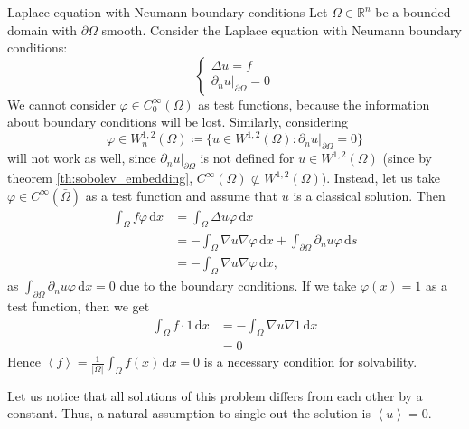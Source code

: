 \documentclass{report}
\begin{document}
\begin{example}{Laplace equation with Neumann boundary conditions}{}
    Let \(\Omega \in \mathbb{R}^{n}\) be a bounded domain with \(\partial \Omega\) smooth. Consider the Laplace equation with Neumann boundary conditions:
    \begin{equation}\label{eq:3.4}
        \begin{cases}
            \Delta u = f \\
            \left. \partial_{n} u \right|_{\partial \Omega} = 0
        \end{cases}
    \end{equation}
    We cannot consider \(\varphi \in C^{\infty}_{0}(\Omega)\) as test functions, because the information about boundary conditions will be lost. Similarly, considering
    \[
        \varphi \in W^{1, 2}_{n}(\Omega) \coloneqq \{u \in W^{1, 2}(\Omega) \colon \left. \partial_{n} u \right|_{\partial \Omega} = 0\}
    \]
    will not work as well, since \(\left. \partial_{n} u \right|_{\partial \Omega}\) is not defined for \(u \in W^{1, 2}(\Omega)\) (since by theorem \ref{th:sobolev_embedding}, \(C^{\infty}(\Omega) \not\subset W^{1, 2}(\Omega)\)). Instead, let us take \(\varphi \in C^{\infty}(\bar{\Omega})\) as a test function and assume that \(u\) is a classical solution. Then
    \begin{align*}
        \int_{\Omega} f \varphi \,\mathrm{d}x &= \int_{\Omega} \Delta  u \varphi \,\mathrm{d}x \\
        &= - \int_{\Omega} \nabla u \nabla \varphi \,\mathrm{d}x + \int_{\partial \Omega} \partial_{n} u \varphi \,\mathrm{d}s \\
        &= - \int_{\Omega} \nabla u \nabla \varphi \,\mathrm{d}x ,
    \end{align*}
    as \(\int_{\partial \Omega} \partial_{n} u \varphi \,\mathrm{d}x = 0\) due to the boundary conditions. If we take \(\varphi(x) = 1\) as a test function, then we get
    \begin{align*}
        \int_{\Omega} f \cdot 1 \,\mathrm{d}x &= - \int_{\Omega} \nabla u \nabla 1 \,\mathrm{d}x \\
        &= 0
    \end{align*}
    Hence \(\left\langle f \right\rangle = \frac{1}{\vert \Omega \vert }\int_{\Omega} f(x) \,\mathrm{d}x = 0\) is a necessary condition for solvability.

    Let us notice that all solutions of this problem differs from each other by a constant. Thus, a natural assumption to single out the solution is \(\left\langle u \right\rangle = 0\). 
\end{example}
\end{document}

